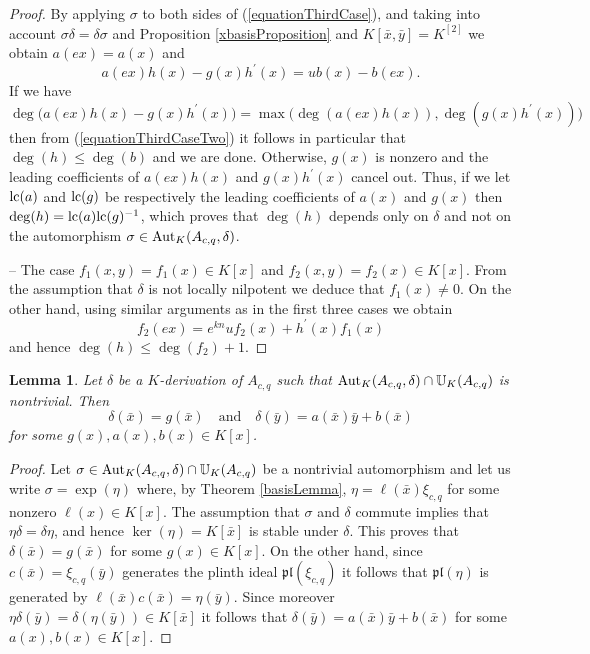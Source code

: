 \documentclass{article}
\newcommand \pl {\mathfrak{pl}}
\renewcommand \a {A}
\renewcommand \k {K}
\newcommand \saut {{\rm \mathbb{U}}}
\newcommand \auto {{\rm Aut}}
\newcommand \lc {{\rm lc}}
\newtheorem{lemma}[theorem]{Lemma}
\begin{document}
{\begin{proof}
	\medskip By applying $\sigma$ to both sides of (\ref{equationThirdCase}), and taking into account $\sigma\delta=\delta\sigma$ and Proposition \ref{xbasisProposition} and $\k[\bar{x},\bar{y}]=\k^{[2]}$ we obtain $a(ex)=a(x)$ and \begin{equation}\label{equationThirdCaseTwo}a(ex)h(x)-g(x)h^{\prime}(x)=ub(x)-b(ex).
	\end{equation} 
	If we have $$\deg\big(a(ex)h(x)-g(x)h^{\prime}(x)\big)=\max\big(\deg(a(ex)h(x)),\deg(g(x)h^{\prime}(x))\big)$$ then from (\ref{equationThirdCaseTwo}) it follows in particular that $\deg(h)\leq \deg(b)$ and we are done. Otherwise, $g(x)$ is nonzero and the leading coefficients of $a(ex)h(x)$ and $g(x)h^{\prime}(x)$ cancel out. Thus, if we let $\lc(a)$ and $\lc(g)$ be respectively the leading coefficients of $a(x)$ and $g(x)$ then $\deg(h)=\lc(a)\lc(g)^{-1}$, which proves that $\deg(h)$ depends only on $\delta$ and not on the automorphism $\sigma\in\auto_{\k}(\a_{c,q},\delta)$.
	
	\medskip -- The case $f_1(x,y)=f_1(x)\in\k[x]$ and $f_2(x,y)=f_2(x)\in\k[x]$. From the assumption that $\delta$ is not locally nilpotent we deduce that $f_1(x)\neq 0$. On the other hand, using similar arguments as in the first three cases we obtain $$f_2(ex)=e^{kn}uf_2(x)+h^{\prime}(x)f_1(x)$$ and hence $\deg(h)\leq \deg(f_2)+1$.
\end{proof}

\begin{lemma}\label{derivationShape}Let $\delta$ be a $\k$-derivation of $\a_{c,q}$ such that $\auto_{\k}(\a_{c,q},\delta)\cap \saut_{\k}(\a_{c,q})$ is nontrivial. Then $$\delta(\bar{x})=g(\bar{x})\quad \mathrm{and}\quad \delta(\bar{y})=a(\bar{x})\bar{y}+b(\bar{x})$$ for some $g(x),a(x),b(x)\in\k[x]$.
\end{lemma}
\begin{proof}Let $\sigma\in \auto_{\k}(\a_{c,q},\delta)\cap \saut_{\k}(\a_{c,q})$ be a nontrivial automorphism and let us write $\sigma=\exp(\eta)$ where, by Theorem \ref{basisLemma}, $\eta=\ell(\bar{x})\xi_{c,q}$ for some nonzero $\ell(x)\in\k[x]$. The assumption that $\sigma$ and $\delta$ commute implies that $\eta\delta=\delta\eta$, and hence $\ker(\eta)=\k[\bar{x}]$ is stable under $\delta$. This proves that $\delta(\bar{x})=g(\bar{x})$ for some $g(x)\in\k[x]$. On the other hand, since $c(\bar{x})=\xi_{c,q}(\bar{y})$ generates the plinth ideal $\pl(\xi_{c,q})$ it follows that $\pl(\eta)$ is generated by $\ell(\bar{x})c(\bar{x})=\eta(\bar{y})$. Since moreover $\eta\delta(\bar{y})=\delta(\eta(\bar{y}))\in\k[\bar{x}]$ it follows that $\delta(\bar{y})=a(\bar{x})\bar{y}+b(\bar{x})$ for some $a(x), b(x)\in\k[x]$.
\end{proof}

}
\end{document}
